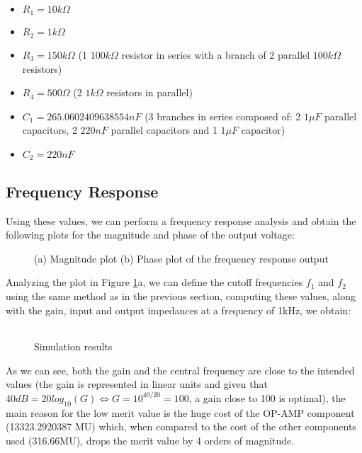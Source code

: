 \begin{itemize}
	\item{$R_1 = 10k\Omega$}
	\item{$R_2 = 1k\Omega$}
	\item{$R_3 = 150k\Omega$ (1 $100k\Omega$ resistor in series with a branch of 2 parallel $100k\Omega$ resistors)}
	\item{$R_4 = 500\Omega$ (2 $1k\Omega$ resistors in parallel)}
	\item{$C_1 = 265.0602409638554nF$ (3 branches in series composed of: 2 $1\mu F$ parallel capacitors, 2 $220nF$ parallel capacitors and 1 $1\mu F$ capacitor)}
	\item{$C_2 = 220nF$}
\end{itemize} 
\pagebreak
\subsection{Frequency Response}

\hspace{12pt} Using these values, we can perform a frequency response analysis and obtain the following plots for the magnitude and phase of the output voltage:

\begin{figure}[h!]
	\centering
	\caption{(a) Magnitude plot (b) Phase plot of the frequency response output}
	\label{fig:gain_sim}
\end{figure}

Analyzing the plot in Figure \ref{fig:gain_sim}a, we can define the cutoff frequencies $f_1$ and $f_2$ using the same method as in the previous section, computing these values, along with the gain, input and output impedances at a frequency of 1kHz, we obtain: 

\begin{figure}[h]
	\centering
	\begin{tabular}{|c|c|}
		\hline
		
	\end{tabular}
	\caption{Simulation results}
	\label{fig:results_sim}
\end{figure}

As we can see, both the gain and the central frequency are close to the intended values (the gain is represented in linear units and given that $40dB = 20log_{10}(G) \iff G = 10^{40/20} = 100$, a gain close to 100 is optimal), the main reason for the low merit value is the huge cost of the OP-AMP component (13323.2920387 MU) which, when compared to the cost of the other components used (316.66MU), drops the merit value by 4 orders of magnitude. 
\pagebreak
